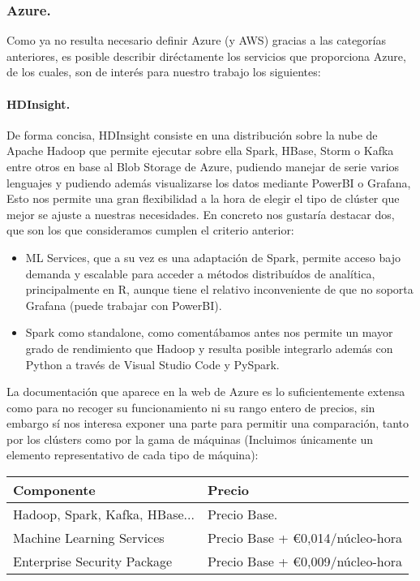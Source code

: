 \documentclass[11pt, a4paper]{article} %
\begin{document}
\subsubsection{Azure.}
Como ya no resulta necesario definir Azure (y AWS) gracias a las categorías anteriores, es posible describir diréctamente los servicios que proporciona Azure, de los cuales, son de interés para nuestro trabajo los siguientes:
\paragraph{HDInsight.}
De forma concisa, HDInsight consiste en una distribución sobre la nube de Apache Hadoop que permite ejecutar sobre ella Spark, HBase, Storm o Kafka entre otros en base al Blob Storage de Azure, pudiendo manejar de serie varios lenguajes y pudiendo además visualizarse los datos mediante PowerBI o Grafana, Esto nos permite una gran flexibilidad a la hora de elegir el tipo de clúster que mejor se ajuste a nuestras necesidades. En concreto nos gustaría destacar dos, que son los que consideramos cumplen el criterio anterior: \cite{docazure}
\begin{itemize}
\item ML Services, que a su vez es una adaptación de Spark, permite acceso bajo demanda y escalable para acceder a métodos distribuídos de analítica, principalmente en R, aunque tiene el relativo inconveniente de que no soporta Grafana (puede trabajar con PowerBI).
\item Spark como standalone, como comentábamos antes nos permite un mayor grado de rendimiento que Hadoop y resulta posible integrarlo además con Python a través de Visual Studio Code y PySpark.
\end{itemize}


La documentación que aparece en la web de Azure es lo suficientemente extensa como para no recoger su funcionamiento ni su rango entero de precios, sin embargo sí nos interesa exponer una parte para permitir una comparación, tanto por los clústers como por la gama de máquinas (Incluimos únicamente un elemento representativo de cada tipo de máquina):\\
\begin{table}[htb]
  \centering
  \begin{tabular}{ | P{3cm} | P{4cm} |}
    \hline
    Componente & Precio \\ \hline
    Hadoop, Spark, Kafka, HBase... & Precio Base. \\ \hline
    Machine Learning Services & Precio Base + €0,014/núcleo-hora \\ \hline
    Enterprise Security Package &  Precio Base + €0,009/núcleo-hora \\ \hline
  \end{tabular}
\end{table}
\end{document}
